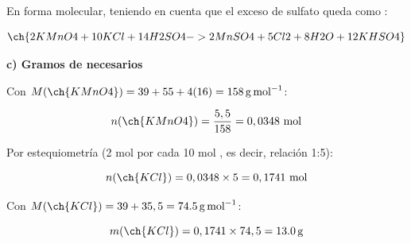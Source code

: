 \begin{exerciseEVAU}
\begin{solu}
        En forma molecular, teniendo en cuenta que el exceso de sulfato queda como :

        \begin{equation*}
            \ch{2 KMnO4 + 10 KCl + 14 H2SO4 -> 2 MnSO4 + 5 Cl2 + 8 H2O + 12 KHSO4}
        \end{equation*}

        \textbf{c) Gramos de  necesarios}

        Con \(M(\ch{KMnO4}) = 39+55+4(16) = \SI{158}{\gram\per\mole}\):

        \begin{equation*}
            n(\ch{KMnO4}) = \dfrac{5,5}{158} = 0,0348 \ \text{mol}
        \end{equation*}

        Por estequiometría (2 mol  por cada 10 mol , es decir, relación 1:5):

        \begin{equation*}
            n(\ch{KCl}) = 0,0348 \times 5 = 0,1741 \ \text{mol}
        \end{equation*}

        Con \(M(\ch{KCl}) = 39+35,5 = \SI{74.5}{\gram\per\mole}\):

        \begin{equation*}
            m(\ch{KCl}) = 0,1741 \times 74,5 = \SI{13.0}{\gram}
        \end{equation*}

    \end{solu}
\end{exerciseEVAU}

